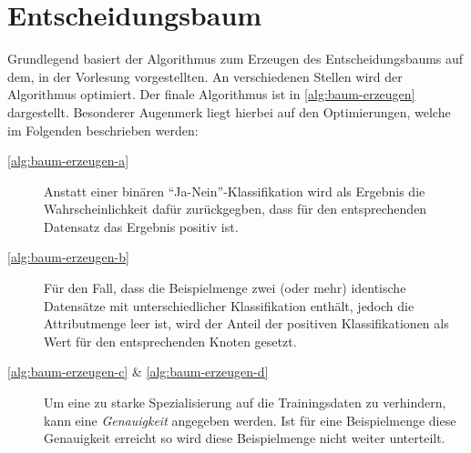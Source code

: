 \newpage
\section{Entscheidungsbaum}\label{sec:entscheidungsbaum}


Grundlegend basiert der Algorithmus zum Erzeugen des Entscheidungsbaums auf dem,
in der Vorlesung vorgestellten. An verschiedenen Stellen wird der Algorithmus optimiert.
Der finale Algorithmus ist in \autoref{alg:baum-erzeugen} dargestellt.
Besonderer Augenmerk liegt hierbei auf den Optimierungen, welche im Folgenden beschrieben werden:
\begin{description}
    \item[\autoref{alg:baum-erzeugen-a}] Anstatt einer binären \enquote{Ja-Nein}-Klassifikation wird als Ergebnis die Wahrscheinlichkeit dafür zurückgegben,
                    dass für den entsprechenden Datensatz das Ergebnis positiv ist.

    \item[\autoref{alg:baum-erzeugen-b}] Für den Fall, dass die Beispielmenge zwei (oder mehr) identische Datensätze mit unterschiedlicher Klassifikation enthält,
    jedoch die Attributmenge leer ist, wird der Anteil der positiven Klassifikationen als Wert für den entsprechenden Knoten gesetzt.
    \item[\autoref{alg:baum-erzeugen-c} \& \autoref{alg:baum-erzeugen-d}] Um eine zu starke Spezialisierung auf die Trainingsdaten zu verhindern, kann eine \textit{Genauigkeit} angegeben werden.
    Ist für eine Beispielmenge diese Genauigkeit erreicht so wird diese Beispielmenge nicht weiter unterteilt.
\end{description}

